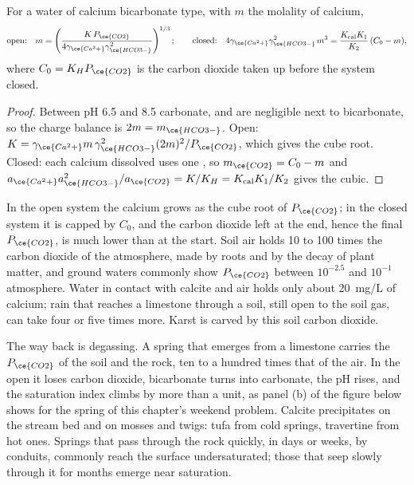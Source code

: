 \begin{theorem}\label{thm:b3:water-rock-interaction:calcite}
For a water of calcium bicarbonate type, with $m$ the molality of calcium,
\[
\text{open:}\quad m = \left(\frac{K\,P_{\ce{CO2}}}{4\gamma_{\ce{Ca^2+}}
\gamma_{\ce{HCO3-}}^2}\right)^{1/3};
\qquad
\text{closed:}\quad 4\gamma_{\ce{Ca^2+}}\gamma_{\ce{HCO3-}}^2\,m^3 =
\frac{K_{\mathrm{cal}}K_1}{K_2}\,(C_0 - m),
\]
where $C_0 = K_H P_{\ce{CO2}}$ is the carbon dioxide taken up before the
system closed.
\end{theorem}

\begin{proof}
Between pH 6.5 and 8.5 carbonate,  and  are negligible next to
bicarbonate, so the charge balance is $2m = m_{\ce{HCO3-}}$. Open: $K = \gamma
_{\ce{Ca^2+}}m\,\gamma_{\ce{HCO3-}}^2(2m)^2/P_{\ce{CO2}}$, which gives the
cube root. Closed: each calcium dissolved uses one , so $m_{\ce{CO2}}
= C_0 - m$ and $a_{\ce{Ca^2+}}a_{\ce{HCO3-}}^2/a_{\ce{CO2}} = K/K_H =
K_{\mathrm{cal}}K_1/K_2$ gives the cubic.
\end{proof}

In the open system the calcium grows as the cube root of $P_{\ce{CO2}}$; in
the closed system it is capped by $C_0$, and the carbon dioxide left at the
end, hence the final $P_{\ce{CO2}}$, is much lower than at the start. Soil
air holds 10 to 100 times the carbon dioxide of the atmosphere, made by roots
and by the decay of plant matter, and ground waters commonly show
$P_{\ce{CO2}}$ between $10^{-2.5}$ and $10^{-1}$ atmosphere. Water in contact
with calcite and air holds only about \qty{20}{mg/L} of calcium; rain that
reaches a limestone through a soil, still open to the soil gas, can take
four or five times more. Karst is carved by this soil carbon dioxide.

The way back is degassing. A spring that emerges from a limestone carries
the $P_{\ce{CO2}}$ of the soil and the rock, ten to a hundred times that of
the air. In the open it loses carbon dioxide, bicarbonate turns into
carbonate, the pH rises, and the saturation index climbs by more than a unit,
as panel (b) of the figure below shows for the spring of this chapter's
weekend problem.
Calcite precipitates on the stream bed and on mosses and twigs: tufa from
cold springs, travertine from hot ones. Springs that pass through the rock
quickly, in days or weeks, by conduits, commonly reach the surface
undersaturated; those that seep slowly through it for months emerge near
saturation.


